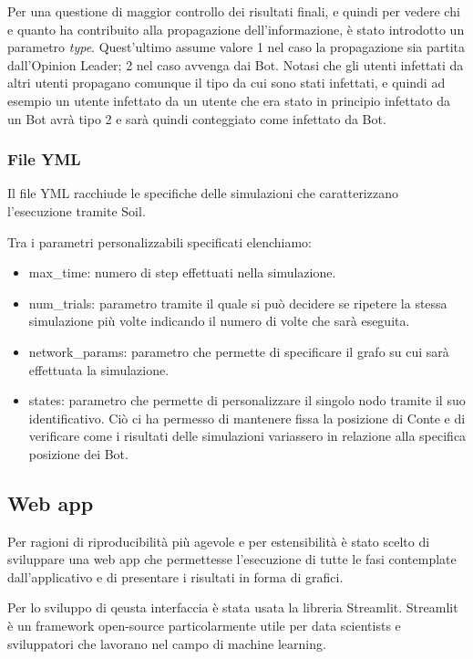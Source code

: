         Per una questione di maggior controllo dei risultati finali, e quindi per vedere chi e quanto ha contribuito alla propagazione dell'informazione, è stato introdotto un parametro \textit{type}. Quest’ultimo assume valore 1 nel caso la propagazione sia partita dall’Opinion Leader; 2 nel caso avvenga dai Bot. Notasi che gli utenti infettati da altri utenti propagano comunque il tipo da cui sono stati infettati, e quindi ad esempio un utente infettato da un utente che era stato in principio infettato da un Bot avrà tipo 2 e sarà quindi conteggiato come infettato da Bot.
        
        \subsubsection{File YML}
        Il file YML racchiude le specifiche delle simulazioni che caratterizzano l'esecuzione tramite Soil.
        
        Tra i parametri personalizzabili specificati elenchiamo:
        \begin{itemize}
          \item max\_time: numero di step effettuati nella simulazione.
          \item num\_trials: parametro tramite il quale si può decidere se ripetere la stessa simulazione più volte indicando il numero di volte che sarà eseguita.
          \item network\_params: parametro che permette di specificare il grafo su cui sarà effettuata la simulazione.
          \item states: parametro che permette di personalizzare il singolo nodo tramite il suo identificativo. Ciò ci ha permesso di mantenere fissa la posizione di Conte e di verificare come i risultati delle simulazioni variassero in relazione alla specifica posizione dei Bot. 
        \end{itemize}

    \subsection{Web app}
      Per ragioni di riproducibilità più agevole e per estensibilità è stato scelto di sviluppare una web app che permettesse l’esecuzione di tutte le fasi contemplate dall’applicativo e di presentare i risultati in forma di grafici.
      
      Per lo sviluppo di qeusta interfaccia è stata usata la libreria Streamlit. Streamlit è un framework open-source particolarmente utile per data scientists e sviluppatori che lavorano nel campo di machine learning.\\

